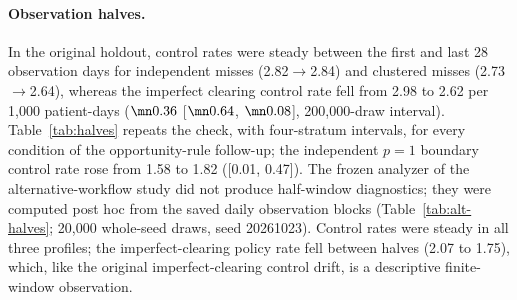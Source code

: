 \paragraph{Observation halves.} In the original holdout, control rates were
steady between the first and last 28 observation days for independent misses
(2.82$\to$2.84) and clustered misses (2.73$\to$2.64), whereas the imperfect
clearing control rate fell from 2.98 to 2.62 per 1,000 patient-days ($\mn0.36$
[$\mn0.64$, $\mn0.08$], 200,000-draw interval). Table~\ref{tab:halves} repeats the
check, with four-stratum intervals, for every condition of the opportunity-rule
follow-up; the independent $p=1$ boundary control rate rose from 1.58 to 1.82
([0.01, 0.47]). The frozen analyzer of the alternative-workflow study did not
produce half-window diagnostics; they were computed post hoc from the saved daily
observation blocks (Table~\ref{tab:alt-halves}; 20,000 whole-seed draws, seed
20261023). Control rates were steady in all three profiles; the imperfect-clearing
policy rate fell between halves (2.07 to 1.75), which, like the original
imperfect-clearing control drift, is a descriptive finite-window observation.

